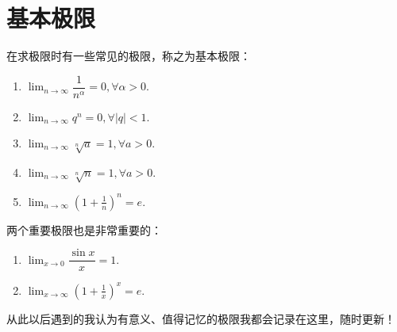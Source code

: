 \section{基本极限}

\begin{proposition}[基本极限]
	在求极限时有一些常见的极限，称之为基本极限：
	\begin{enumerate}
		\item $\displaystyle\lim_{n\to\infty}\dfrac{1}{n^\alpha}=0,\forall\alpha>0.$
		\item $\displaystyle\lim_{n\to\infty}q^n=0,\forall |q|<1.$
		\item $\displaystyle\lim_{n\to\infty}\sqrt[n]{a}=1,\forall a>0.$
		\item $\displaystyle\lim_{n\to\infty}\sqrt[n]{n}=1,\forall a>0.$
		\item $\displaystyle\lim_{n\to\infty}(1+\frac{1}{n})^n=e.$
	\end{enumerate}
\end{proposition}

\begin{proposition}[重要极限]
	两个重要极限也是非常重要的：
	\begin{enumerate}
		\item $\displaystyle\lim_{x\to 0}\dfrac{\sin{x}}{x}=1.$
		\item $\displaystyle\lim_{x\to\infty}(1+\frac{1}{x})^x=e.$
	\end{enumerate}
\end{proposition}

从此以后遇到的我认为有意义、值得记忆的极限我都会记录在这里，随时更新！


